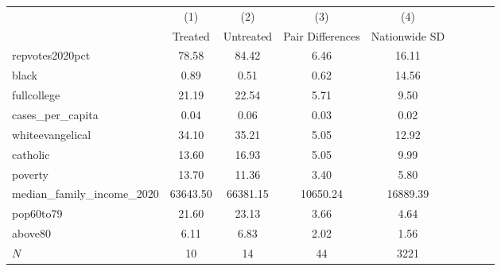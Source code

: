 {
\def\sym#1{\ifmmode^{#1}\else\(^{#1}\)\fi}
\begin{tabular}{l*{4}{cc}}
\hline\hline
            &\multicolumn{1}{c}{(1)}&\multicolumn{1}{c}{(2)}&\multicolumn{1}{c}{(3)}&\multicolumn{1}{c}{(4)}\\
            &     Treated&   Untreated&Pair Differences&Nationwide SD\\
\hline
repvotes2020pct&       78.58&       84.42&        6.46&       16.11\\
black       &        0.89&        0.51&        0.62&       14.56\\
fullcollege &       21.19&       22.54&        5.71&        9.50\\
cases\_per\_capita&        0.04&        0.06&        0.03&        0.02\\
whiteevangelical&       34.10&       35.21&        5.05&       12.92\\
catholic    &       13.60&       16.93&        5.05&        9.99\\
poverty     &       13.70&       11.36&        3.40&        5.80\\
median\_family\_income\_2020&    63643.50&    66381.15&    10650.24&    16889.39\\
pop60to79   &       21.60&       23.13&        3.66&        4.64\\
above80     &        6.11&        6.83&        2.02&        1.56\\
\hline
\(N\)       &          10&          14&          44&        3221\\
\hline\hline
\end{tabular}
}
